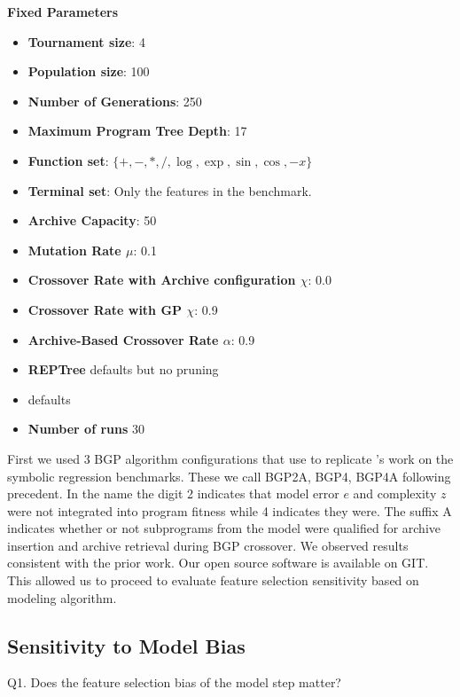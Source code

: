 \textbf{Fixed Parameters}\label{appendix:fixed_parameters}
\begin{itemize}
\item \textbf{Tournament size}: 4
\item \textbf{Population size}: 100
\item \textbf{Number of Generations}: 250
\item \textbf{Maximum Program Tree Depth}: 17
\item \textbf{Function set}: $\{ +, -, *, /, \log, \exp, \sin, \cos, -x \}$
\item \textbf{Terminal set}: Only the features in the benchmark.
\item \textbf{Archive Capacity}: 50
\item \textbf{Mutation Rate $\mu$}: 0.1
\item \textbf{Crossover Rate with Archive configuration $\chi$}: 0.0
\item \textbf{Crossover Rate with GP $\chi$}: 0.9
\item \textbf{Archive-Based Crossover Rate $\alpha$}: 0.9
\item \textbf{REPTree}  defaults but no pruning
\item \textbf{\SCIKIT} defaults
\item \textbf{Number of runs} 30
\end{itemize}

First we used 3 BGP algorithm configurations that use \REPTREE to replicate \cite{krawiecGecco2014}'s work on the symbolic regression benchmarks. These we call BGP2A, BGP4, BGP4A following precedent. In the name the digit 2 indicates that model error $e$ and complexity $z$ were not integrated into program fitness while 4 indicates they were.   The suffix A indicates whether or not subprograms from the model were qualified for archive insertion and archive retrieval during BGP crossover. We observed results consistent with the prior work. Our open source software is available on GIT.
This allowed us to proceed to evaluate feature selection sensitivity based on modeling algorithm.

\subsection{Sensitivity to Model Bias}\label{sect:ftr-select}

Q1. Does the feature selection bias of the model step matter? 



